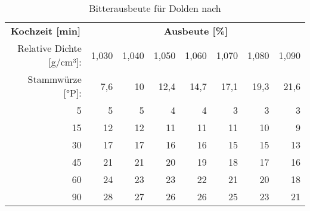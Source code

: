 \documentclass[a4paper,parskip=half]{scrartcl}
\begin{document}
\begin{table}[H]
\centering
\begin{tabular}{rrrrrrrr} 
\toprule
\multicolumn{1}{c}{\textbf{Kochzeit [min]}} & \multicolumn{7}{c}{\textbf{Ausbeute [\%]}}  \\
Relative Dichte [g/cm³]:                                        & 1,030 & 1,040 & 1,050 & 1,060 & 1,070 & 1,080  & 1,090                   \\
Stammwürze [°P]:                                            & 7,6 & 10 & 12,4 & 14,7 & 17,1 & 19,3  & 21,6                   \\                                            
\midrule

5                                            & 5     & 5     & 4     & 4     & 3     & 3      & 3                          \\
15                                           & 12    & 12    & 11    & 11    & 11    & 10     & 9                          \\
30                                           & 17    & 17    & 16    & 16    & 15    & 15     & 13                         \\
45                                           & 21    & 21    & 20    & 19    & 18    & 17     & 16                         \\
60                                           & 24    & 23    & 23    & 22    & 21    & 20     & 18                         \\
90                                           & 28    & 27    & 26    & 26    & 25    & 23     & 21                         \\
\bottomrule
\end{tabular}
\caption{Bitterausbeute für Dolden nach \citeauthor{Mosher1994} \parencite[51]{Holle2010}}
\label{table:mosherutil}
\end{table}
\end{document}
